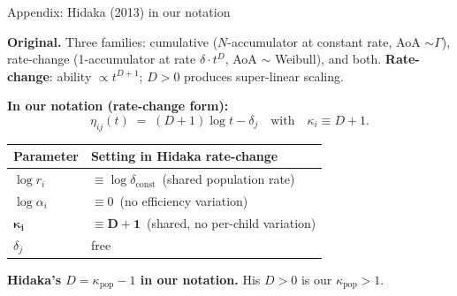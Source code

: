 \documentclass[
  ignorenonframetext,
  aspectratio=169,
  t]{beamer}
\renewcommand{\arraystretch}{1.10}
\newcommand{\kappap}{\kappa_{\text{pop}}}
\begin{document}
\begin{frame}{Appendix: Hidaka (2013) in our notation}
\label{appendix-hidaka-2013-in-our-notation}
\small

\textbf{Original.} Three families: cumulative (\(N\)-accumulator at
constant rate, AoA \(\sim \Gamma\)), rate-change (1-accumulator at rate
\(\delta\cdot t^D\), AoA \(\sim\) Weibull), and both.
\textbf{Rate-change}: ability \(\propto t^{D+1}\); \(D > 0\) produces
super-linear scaling.

\vspace{0.6em}
\centering

\textbf{In our notation (rate-change form):} \[
\eta_{ij}(t) \;=\; (D+1) \log t - \delta_j
\quad\text{with}\quad \kappa_i \equiv D+1.
\]

\vspace{0.4em}
\renewcommand{\arraystretch}{1.20}
\begin{tabular}{@{}ll@{}}
\toprule
\textbf{Parameter} & \textbf{Setting in Hidaka rate-change} \\
\midrule
$\log r_i$         & $\equiv \log\delta_{\text{const}}$ \,(shared population rate) \\
$\log\alpha_i$     & $\equiv 0$ \,(no efficiency variation) \\
$\boldsymbol{\kappa_i}$ & $\boldsymbol{\equiv D+1}$ \,(shared, no per-child variation) \\
$\delta_j$         & free \\
\bottomrule
\end{tabular}

\vspace{0.6em}

\textbf{Hidaka's \(D = \kappap - 1\) in our notation.} His \(D > 0\) is
our \(\kappap > 1\).
\end{frame}
\end{document}
